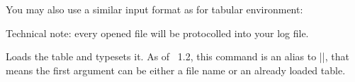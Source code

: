 \begin{command}{\pgfplotstabletypeset{}}
You may also use a similar input format as for tabular environment:
\begin{codeexample}[width=8cm]
\end{codeexample}


Technical note: every opened file will be protocolled into your log file.
\end{command}

\begin{command}{\pgfplotstabletypesetfile{}}
	Loads the table  and typesets it. As of \PGFPlotstable\ 1.2, this command is an alias to |\pgfplotstabletypeset|, that means the first argument can be either a file name or an already loaded table.
\end{command}


